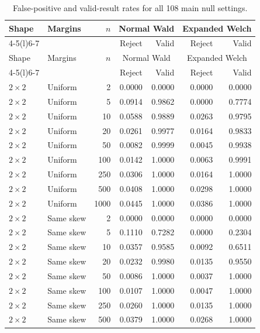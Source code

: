 \begingroup\small
\setlength{\tabcolsep}{4pt}
\begin{longtable}{@{}llrrrrr@{}}
\caption{False-positive and valid-result rates for all 108 main null settings.}
\label{tab:all-main-null}\\
\toprule
Shape & Margins & $n$ & \multicolumn{2}{c}{Normal Wald} & \multicolumn{2}{c}{Expanded Welch}\\
\cmidrule(lr){4-5}\cmidrule(l){6-7}
 & & & Reject & Valid & Reject & Valid\\
\midrule\endfirsthead
\toprule
Shape & Margins & $n$ & \multicolumn{2}{c}{Normal Wald} & \multicolumn{2}{c}{Expanded Welch}\\
\cmidrule(lr){4-5}\cmidrule(l){6-7}
 & & & Reject & Valid & Reject & Valid\\
\midrule\endhead
\(2\times2\) & Uniform & 2 & 0.0000 & 0.0000 & 0.0000 & 0.0000 \\
\(2\times2\) & Uniform & 5 & 0.0914 & 0.9862 & 0.0000 & 0.7774 \\
\(2\times2\) & Uniform & 10 & 0.0588 & 0.9889 & 0.0263 & 0.9795 \\
\(2\times2\) & Uniform & 20 & 0.0261 & 0.9977 & 0.0164 & 0.9833 \\
\(2\times2\) & Uniform & 50 & 0.0082 & 0.9999 & 0.0045 & 0.9938 \\
\(2\times2\) & Uniform & 100 & 0.0142 & 1.0000 & 0.0063 & 0.9991 \\
\(2\times2\) & Uniform & 250 & 0.0306 & 1.0000 & 0.0164 & 1.0000 \\
\(2\times2\) & Uniform & 500 & 0.0408 & 1.0000 & 0.0298 & 1.0000 \\
\(2\times2\) & Uniform & 1000 & 0.0445 & 1.0000 & 0.0386 & 1.0000 \\
\addlinespace
\(2\times2\) & Same skew & 2 & 0.0000 & 0.0000 & 0.0000 & 0.0000 \\
\(2\times2\) & Same skew & 5 & 0.1110 & 0.7282 & 0.0000 & 0.2304 \\
\(2\times2\) & Same skew & 10 & 0.0357 & 0.9585 & 0.0092 & 0.6511 \\
\(2\times2\) & Same skew & 20 & 0.0232 & 0.9980 & 0.0135 & 0.9550 \\
\(2\times2\) & Same skew & 50 & 0.0086 & 1.0000 & 0.0037 & 1.0000 \\
\(2\times2\) & Same skew & 100 & 0.0107 & 1.0000 & 0.0047 & 1.0000 \\
\(2\times2\) & Same skew & 250 & 0.0260 & 1.0000 & 0.0135 & 1.0000 \\
\(2\times2\) & Same skew & 500 & 0.0379 & 1.0000 & 0.0268 & 1.0000 \\

\end{longtable}
